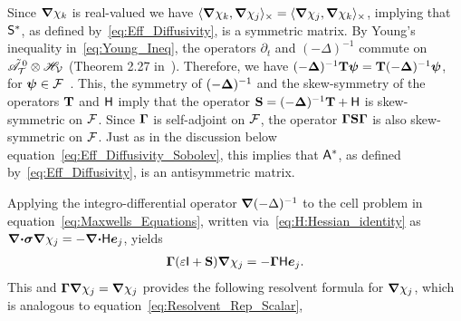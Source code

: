 \documentclass[amsa]{ipart}
\begin{document}
  
Since $\mbox{\boldmath${\nabla}$}\chi_k$ is real-valued we have 
$\langle\mbox{\boldmath${\nabla}$}\chi_k,\mbox{\boldmath${\nabla}$}\chi_j\rangle_\times=\langle\mbox{\boldmath${\nabla}$}\chi_j,\mbox{\boldmath${\nabla}$}\chi_k\rangle_\times$, implying that
$\mathsf{S}^*$, as defined by~\eqref{eq:Eff_Diffusivity}, is a symmetric
matrix. By Young's inequality  
in~\eqref{eq:Young_Ineq}, the operators $\partial_t$ and $(-\Delta)^{-1}$
commute on $\tilde{\mathscr{A}}^{\,0}_{\mathcal{T}}\otimes\mathscr{H}_{\mathcal{V}}$ (Theorem 2.27
in~\cite{Folland:99:RealAnalysis}). Therefore,  we have
$(-\mbox{\boldmath${\Delta}$})^{-1}\mathbf{T}\boldsymbol{\psi}=\mathbf{T}(-\mbox{\boldmath${\Delta}$})^{-1}\boldsymbol{\psi}$, for
$\boldsymbol{\psi}\in\mathcal{F}$~\cite{Folland:99:RealAnalysis,Stakgold:BVP:2000}. This,
the symmetry of $(-\mbox{\boldmath${\Delta}$})^{-1}$ and the skew-symmetry of the
operators $\mathbf{T}$ and $\mathsf{H}$ imply that the operator 
$\mathbf{S}=(-\mbox{\boldmath${\Delta}$})^{-1}\mathbf{T}+\mathsf{H}$ is skew-symmetric on
$\mathcal{F}$. Since $\mbox{\boldmath${\Gamma}$}$ is self-adjoint on $\mathcal{F}$, the operator
$\mbox{\boldmath${\Gamma}$}\mathbf{S}\mbox{\boldmath${\Gamma}$}$ is also skew-symmetric on $\mathcal{F}$. Just as in the
discussion below equation~\eqref{eq:Eff_Diffusivity_Sobolev}, this
implies that $\mathsf{A}^*$, as defined by~\eqref{eq:Eff_Diffusivity}, is an
antisymmetric matrix. 


Applying the integro-differential operator $\mbox{\boldmath${\nabla}$}(-\Delta)^{-1}$ to the
cell problem in equation~\eqref{eq:Maxwells_Equations}, written
via~\eqref{eq:H:Hessian_identity} as
$\mbox{\boldmath${\nabla}$}\mbox{\boldmath${\cdot}$}\mbox{\boldmath${\sigma}$}\mbox{\boldmath${\nabla}$}\chi_j=-\mbox{\boldmath${\nabla}$}\mbox{\boldmath${\cdot}$}\mathsf{H}\boldsymbol{e}_j$, yields 
%
\begin{align}\label{eq:Pre_Resolvent}
  \bGamma(\varepsilon\Ib+\Sb)\bnabla \chi_j=-\bGamma\Hm\vece_j.
\end{align}
%
This and $\mbox{\boldmath${\Gamma}$}\mbox{\boldmath${\nabla}$}\chi_j=\mbox{\boldmath${\nabla}$}\chi_j$ provides the
following resolvent formula for $\mbox{\boldmath${\nabla}$}\chi_j$, which is analogous to 
equation~\eqref{eq:Resolvent_Rep_Scalar},
\end{document}

